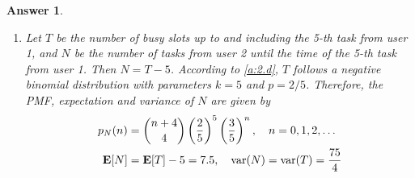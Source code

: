 \documentclass[utf8]{article}
\theoremstyle{definition}%
\theoremstyle{plain}%
\newtheorem{answer}{Answer} %
\begin{document}
\begin{answer}
\begin{enumerate}[label=(\alph*)]
        \begin{equation}
            \E[\text{busy slots up to and including the 5-th task from user 1}] = \frac{5}{p} = 12.5
        \end{equation}
        \item Let $T$ be the number of busy slots up to and including the 5-th task from user 1, and $N$ be the number of tasks from user 2 until the time of the 5-th task from user 1. Then $N = T - 5$. According to \ref{a:2.d}, $T$ follows a negative binomial distribution with parameters $k = 5$ and $p = 2/5$. Therefore, the PMF, expectation and variance of $N$ are given by
        \begin{equation}
        \begin{aligned}
            p_N(n) &= \binom{n + 4}{4} \left(\frac{2}{5}\right)^5 \left(\frac{3}{5}\right)^n, \quad n = 0, 1, 2, \ldots \\ 
            \mathbf{E}[N] &= \mathbf{E}[T] - 5 = 7.5, \quad \mathrm{var}(N) = \mathrm{var}(T) = \frac{75}{4}
        \end{aligned}
        \end{equation}
    \end{enumerate}
\end{answer}
\end{document}
